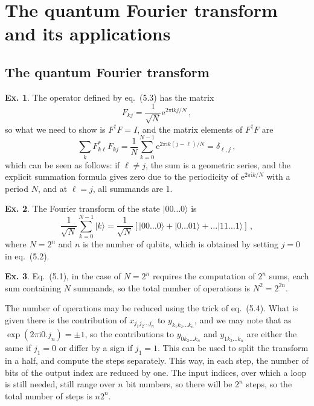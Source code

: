 \documentclass[a4paper,12pt]{article}
\def\e{\mathrm{e}}
\def\imagi{\mathrm{i}}
\theoremstyle{definition}
\newtheorem{exercise}{Ex.}[section]
\begin{document}
\section{The quantum Fourier transform and its applications}\label{sec:quantumFourierTransform}
\subsection{The quantum Fourier transform}\label{ssec:quantumFourierTransform}

\begin{exercise}\label{ex:FTunitary}
 The operator defined by eq.\ (5.3) has the matrix
 \[
  F_{kj} = \frac{1}{\sqrt{N}}\e^{2\pi\imagi k j/N}\,,
 \]
 so what we need to show is $F^\dagger F=I$, and the matrix elements of $F^\dagger F$ are
 \[
  \sum_{k}F_{k\ell}^* F_{kj} = \frac{1}{N}\sum_{k=0}^{N-1} \e^{2\pi\imagi k(j-\ell)/N}=\delta_{\ell,j}\,,
 \]
 which can be seen as follows: if $\ell\ne j$, the sum is a geometric series, and the explicit summation formula gives zero due to the periodicity of $\e^{2\pi \imagi k/N}$ with a period $N$, and at $\ell=j$, all summands are 1.
\end{exercise}

\begin{exercise}
 The Fourier transform of the state $|00\dots 0\rangle$ is
 \[
  \frac{1}{\sqrt{N}}\sum_{k=0}^{N-1} |k\rangle = \frac{1}{\sqrt{N}}\left[|00\dots 0\rangle + |0\dots01\rangle + \dots |11\dots 1\rangle\right]\,,
 \]
 where $N=2^n$ and $n$ is the number of qubits, which is obtained by setting $j=0$ in eq.\ (5.2).
\end{exercise}

\begin{exercise}
 Eq.\ (5.1), in the case of $N=2^n$ requires the computation of $2^n$ sums, each sum containing $N$ summands, so the total number of operations is $N^2=2^{2n}$.
 
 The number of operations may be reduced using the trick of eq.\ (5.4). What is given there is the contribution of $x_{j_1j_2\dots j_n}$ to $y_{k_1k_2\dots k_n}$, and we may note that as $\exp(2\pi\imagi 0.j_n)=\pm 1$, so the contributions to $y_{0k_2\dots k_n}$ and $y_{1k_2\dots k_n}$ are either the same if $j_1=0$ or differ by a sign if $j_1=1$. This can be used to split the transform in a half, and compute the steps separately. This way, in each step, the number of bits of the output index are reduced by one. The input indices, over which a loop is still needed, still range over $n$ bit numbers, so there will be $2^n$ steps, so the total number of steps is $n2^n$.
\end{exercise}
\end{document}
